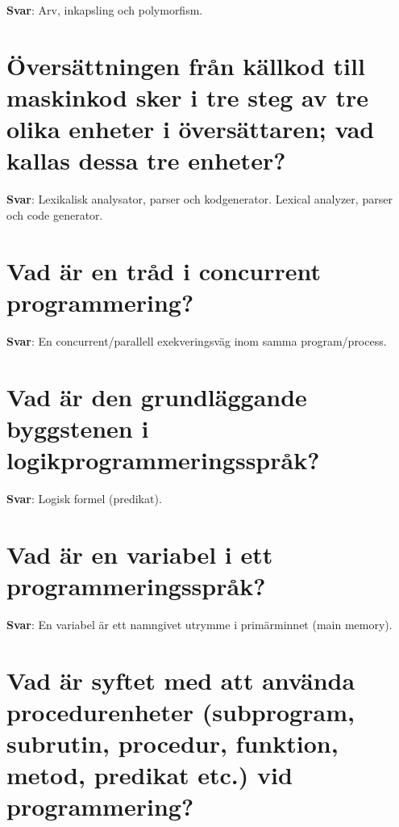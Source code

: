 \documentclass[a4paper,11pt,oneside]{book}
\begin{document}
\begin{sloppypar}
\label{q:213:sa:sv:True}

\textbf{Svar}: Arv, inkapsling och polymorfism.



\section{\"Overs\"attningen fr\r{a}n k\"allkod till maskinkod sker i tre steg av tre olika enheter i \"overs\"attaren; vad kallas dessa tre enheter?}

\label{q:214:sa:sv:True}

\textbf{Svar}: Lexikalisk analysator, parser och kodgenerator. Lexical analyzer, parser och code generator.



\section{Vad \"ar en tr\r{a}d i concurrent programmering?}

\label{q:215:sa:sv:True}

\textbf{Svar}: En concurrent/parallell exekveringsv\"ag inom samma program/process.



\section{Vad \"ar den grundl\"aggande byggstenen i logikprogrammeringsspr\r{a}k?}

\label{q:216:sa:sv:True}

\textbf{Svar}: Logisk formel (predikat).



\section{Vad \"ar en variabel i ett programmeringsspr\r{a}k?}

\label{q:217:sa:sv:True}

\textbf{Svar}: En variabel \"ar ett namngivet utrymme i prim\"arminnet (main memory).



\section{Vad \"ar syftet med att anv\"anda procedurenheter (subprogram, subrutin, procedur, funktion, metod, predikat etc.) vid programmering?}


\end{sloppypar}
\end{document}
